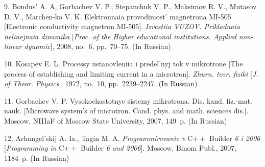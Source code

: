 {{9.} Bondus' A. A, Gorbachev V. P., Stepanchuk V. P., Maksimov R.
V., Mutasov D. V., Marchen-\linebreak ko V. K. Elektronnaia
provodimost' magnetrona MI-505 [Electronic conductivity magnetron
MI-505]. {\it Izvestiia VUZOV. Prikladnaia nelinejnaia dinamika}
[{\it Proc. of the Higher educational institutions. Applied
non-linear dynamic}], 2008, no.~6, pp.~70--75. (In Russian)

{10.} Kosapev E. L. Processy ustanovleniia i predel'nyj tok v
mikrotrone [The process of establishing and limiting current in a
microtron]. {\it Zhurn. teor. fiziki} [{\it J. of Theor.
Physics}], 1972, no.~10, pp.~2239--2247. (In Russian)

{11.} Gorbachev V. P.  Vysokochastotnye sistemy mikrotrona. Dis.
kand. fiz.-mat. nauk. [Microwave system's of microtron. Cand.
phys. and math. sciences dis.]. Moscow, NIIIaF of Moscow State
University, 2007, 149~p. (In Russian)

{12.}  Arhangel'skij A. Ia., Tagin M. A. {\it Programmirovanie v}
C$++$ Builder {\it 6 i 2006} [{\it Programming in} C$++$ Builder
{\it 6 and 2006}]. Moscow, Binom Publ., 2007,  1184~p. (In
Russian)




}
